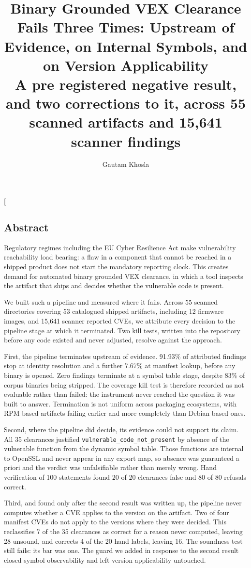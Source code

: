 \documentclass[10pt,twocolumn]{article}
\title{\vspace{-1.5em}\bfseries Binary Grounded VEX Clearance Fails Three Times: Upstream of Evidence, on Internal Symbols, and on Version Applicability\\[2pt]\large A pre registered negative result, and two corrections to it, across 55 scanned artifacts and 15,641 scanner findings}
\author{Gautam Khosla}
\date{}
\begin{document}
\twocolumn[\maketitle
\begin{center}\begin{minipage}{0.86\textwidth}
\subsection*{Abstract}
\small
Regulatory regimes including the EU Cyber Resilience Act make vulnerability reachability load bearing: a flaw in a component that cannot be reached in a shipped product does not start the mandatory reporting clock. This creates demand for automated binary grounded VEX clearance, in which a tool inspects the artifact that ships and decides whether the vulnerable code is present.

We built such a pipeline and measured where it fails. Across 55 scanned directories covering 53 catalogued shipped artifacts, including 12 firmware images, and 15,641 scanner reported CVEs, we attribute every decision to the pipeline stage at which it terminated. Two kill tests, written into the repository before any code existed and never adjusted, resolve against the approach.

First, the pipeline terminates upstream of evidence. 91.93\% of attributed findings stop at identity resolution and a further 7.67\% at manifest lookup, before any binary is opened. Zero findings terminate at a symbol table stage, despite 83\% of corpus binaries being stripped. The coverage kill test is therefore recorded as not evaluable rather than failed: the instrument never reached the question it was built to answer. Termination is not uniform across packaging ecosystems, with RPM based artifacts failing earlier and more completely than Debian based ones.

Second, where the pipeline did decide, its evidence could not support its claim. All 35 clearances justified \texttt{vulnerable\_code\_not\_present} by absence of the vulnerable function from the dynamic symbol table. Those functions are internal to OpenSSL and never appear in any export map, so absence was guaranteed a priori and the verdict was unfalsifiable rather than merely wrong. Hand verification of 100 statements found 20 of 20 clearances false and 80 of 80 refusals correct.

Third, and found only after the second result was written up, the pipeline never computes whether a CVE applies to the version on the artifact. Two of four manifest CVEs do not apply to the versions where they were decided. This reclassifies 7 of the 35 clearances as correct for a reason never computed, leaving 28 unsound, and corrects 4 of the 20 hand labels, leaving 16. The soundness test still fails: its bar was one. The guard we added in response to the second result closed symbol observability and left version applicability untouched.


\end{minipage}
\end{center}
\end{document}
